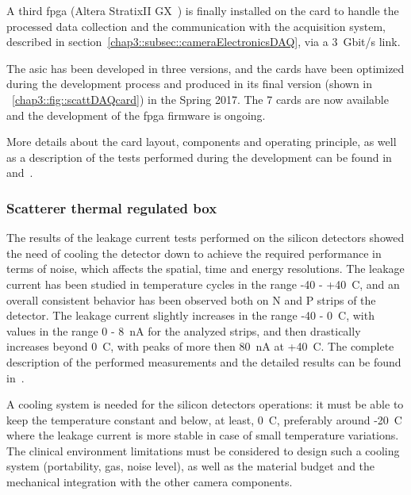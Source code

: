 A third \gls{fpga} (Altera StratixII GX~\parencite{Altera2009}) is finally installed on the card to handle the processed data collection and the communication with the acquisition system, described in section~\ref{chap3::subsec::cameraElectronicsDAQ}, via a 3~Gbit/s link.

The \gls{asic} has been developed in three versions, and the cards have been optimized during the development process and produced in its final version (shown in \figurename~\ref{chap3::fig::scattDAQcard}) in the Spring 2017. The 7 cards are now available and the development of the \gls{fpga} firmware is ongoing.

More details about the card layout, components and operating principle, as well as a description of the tests performed during the development can be found in~\cite{Chen2017} and~\cite{Dahoumane2012}.    

\subsubsection{Scatterer thermal regulated box}\label{chap3::subsubsec::ScattThermBox}

The results of the leakage current tests performed on the silicon detectors showed the need of cooling the detector down to achieve the required performance in terms of noise, which affects the spatial, time and energy resolutions. The leakage current has been studied in temperature cycles in the range -40 - +40~\textdegree{}C, and an overall consistent behavior has been observed both on N and P strips of the detector. The leakage current slightly increases in the range -40 - 0~\textdegree{}C, with values in the range 0 - 8~nA for the analyzed strips, and then drastically increases beyond 0~\textdegree{}C, with peaks of more then 80~nA at +40~\textdegree{}C. The complete description of the performed measurements and the detailed results can be found in~\cite{Ley2015}.

A cooling system is needed for the silicon detectors operations: it must be able to keep the temperature constant and below, at least, 0~\textdegree{}C, preferably around -20~\textdegree{}C where the leakage current is more stable in case of small temperature variations. The clinical environment limitations must be considered to design such a cooling system (portability, gas, noise level), as well as the material budget and the mechanical integration with the other camera components.

